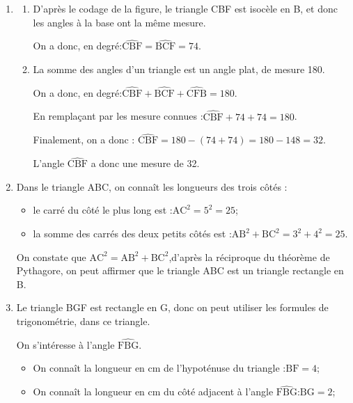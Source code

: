\begin{enumerate}
	\item \begin{enumerate}
		\item D'après le codage de la figure, le triangle CBF est isocèle en B, et donc les angles à la base ont la même mesure.

		On a donc, en degré:\quad $\widehat{\mathrm{CBF}} = \widehat{\mathrm{BCF}} = 74$.

		\item La somme des angles d'un triangle est un angle plat, de mesure 180\degres.

		On a donc, en degré:\quad $\widehat{\mathrm{CBF}}+\widehat{\mathrm{BCF}}+\widehat{\mathrm{CFB}} = 180$.

		En remplaçant par les mesure connues :\quad $\widehat{\mathrm{CBF}} + 74 + 74 = 180$.

		Finalement, on a donc : \quad $\widehat{\mathrm{CBF}} = 180 - (74 + 74) = 180 - 148 = 32$.

		L'angle $\widehat{\mathrm{CBF}}$ a donc une mesure de 32\degres.
	\end{enumerate}

	\item Dans le triangle ABC, on connaît les longueurs des trois côtés :
	\begin{itemize}
		\item le carré du côté le plus long est :\quad $\mathrm{AC}^2 = 5^2 = 25$;
		\item la somme des carrés des deux petits côtés est :\quad $\mathrm{AB}^2 + \mathrm{BC}^2 = 3^2 + 4^2 = 25$.
	\end{itemize}

	On constate que \quad $\mathrm{AC}^2 = \mathrm{AB}^2 + \mathrm{BC}^2$,\quad d'après la réciproque du théorème de Pythagore, on peut affirmer que le triangle ABC est un triangle rectangle en B.

	\item Le triangle BGF est rectangle en G, donc on peut utiliser les formules de trigonométrie, dans ce triangle.

	On s'intéresse à l'angle $\widehat{\mathrm{FBG}}$.

	\begin{itemize}
		\item On connaît la longueur en cm de l'hypoténuse du triangle :\quad $\mathrm{BF} = 4$;
		\item On connaît la longueur en cm du côté adjacent à l'angle $\widehat{\mathrm{FBG}}$:\quad $\mathrm{BG} = 2$;
	\end{itemize}


\end{enumerate}
